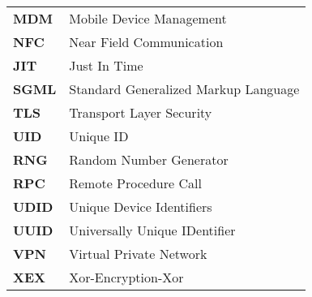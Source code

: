 \begin{table*}[htbp]
\begin{tabular}{p{3cm}p{12cm}}
		     \textbf{MDM} & Mobile Device Management \\
		     
		     \textbf{NFC} & Near Field Communication \\
             
             \textbf{JIT} & Just In Time \\		     
		     
		     \textbf{SGML} & Standard Generalized Markup Language \\
 		     
 		     \textbf{TLS} & Transport Layer Security \\
 		     
 		     \textbf{UID} & Unique ID \\
 		     
 		     \textbf{RNG} & Random Number Generator\\
 		     \textbf{RPC} & Remote Procedure Call \\
 		     
 		     \textbf{UDID} & Unique Device Identifiers\\
 		     \textbf{UUID} &  Universally Unique IDentifier \\
 		 	 
 		 	 \textbf{VPN} & Virtual Private Network \\
	         \textbf{XEX} &  Xor-Encryption-Xor \\  
		\end{tabular}
\end{table*}